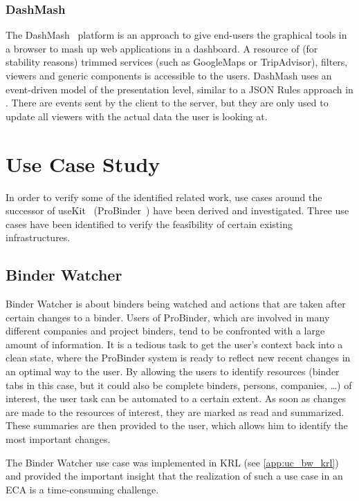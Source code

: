 \documentclass[11pt]{article}%
\begin{document}
\subsubsection{DashMash}
The DashMash~\cite{2011-Cappiello_etal-DashMash.pdf} platform is an approach to give end-users the graphical tools in a browser to mash up web applications in a dashboard. A resource of (for stability reasons) trimmed services (such as GoogleMaps or TripAdvisor), filters, viewers and generic components is accessible to the users. DashMash uses an event-driven model of the presentation level, similar to a JSON Rules approach in \cite{2009-Pascalau_Giurca-RBACEM.pdf}. There are events sent by the client to the server, but they are only used to update all viewers with the actual data the user is looking at.

\section{Use Case Study}
In order to verify some of the identified related work, use cases around the successor of useKit~\cite{2010-Rizzotti_Burkhart-useKit.pdf} (ProBinder~\cite{wwwprobinder}) have been derived and investigated. 
Three use cases have been identified to verify the feasîbility of certain existing infrastructures.

\subsection{Binder Watcher}
Binder Watcher is about binders being watched and actions that are taken after certain changes to a binder. Users of ProBinder, which are involved in many different companies and project binders, tend to be confronted with a large amount of information. It is a tedious task to get the user's context back into a clean state, where the ProBinder system is ready to reflect new recent changes in an optimal way to the user. By allowing the users to identify resources (binder tabs in this case, but it could also be complete binders, persons, companies, \dots) of interest, the user task can be automated to a certain extent. As soon as changes are made to the resources of interest, they are marked as read and summarized. These summaries are then provided to the user, which allows him to identify the most important changes.

The Binder Watcher use case was implemented in KRL (see \ref{app:uc_bw_krl}) and provided the important insight that the realization of such a use case in an ECA is a time-consuming challenge. 
\end{document}
